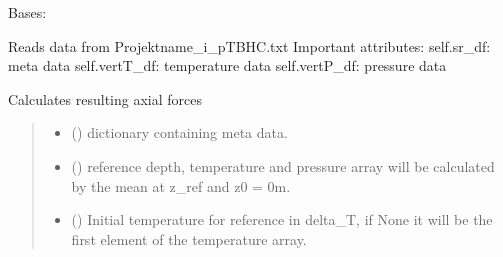 \documentclass[letterpaper,10pt,english]{sphinxmanual}
\begin{document}
\begin{fulllineitems}
\label{\detokenize{tscw_module:tscw_module.tscw_DataClassesOutput.TSCW_TBHC}}
\pysigstartsignatures
{}
\pysigstopsignatures
\sphinxAtStartPar
Bases: {\hyperref[\detokenize{tscw_module:tscw_module.tscw_DataClassesOutput.TSCW_Output}]{}}

\sphinxAtStartPar
Reads data from Projektname\_i\_pTBHC.txt
Important attributes:
self.sr\_df: \sphinxhyphen{} meta data
self.vertT\_df: \sphinxhyphen{} temperature data
self.vertP\_df: \sphinxhyphen{} pressure data

\begin{fulllineitems}
\label{\detokenize{tscw_module:tscw_module.tscw_DataClassesOutput.TSCW_TBHC.calculate_axial_forces}}
\pysigstartsignatures
{}
\pysigstopsignatures
\sphinxAtStartPar
Calculates resulting axial forces
\begin{quote}\begin{description}
\begin{itemize}
\item {} 
\sphinxAtStartPar
{} () \textendash{} dictionary containing meta data.

\item {} 
\sphinxAtStartPar
{} () \textendash{} reference depth, temperature and pressure array will be calculated by the mean at z\_ref and z0 = 0m.

\item {} 
\sphinxAtStartPar
{} (\sphinxstyleliteralemphasis{\sphinxupquote{, }}) \textendash{} Initial temperature for reference in delta\_T, if None it will be the first element of the temperature array.


\end{itemize}
\end{description}
\end{quote}
\end{fulllineitems}
\end{fulllineitems}
\end{document}

